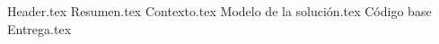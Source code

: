 \documentclass[letterpaper]{article}
\begin{document}
  {Header.tex}
  \vspace{1ex}
  {Resumen.tex}
  {Contexto.tex}
  {Modelo de la solución.tex}
  {Código base}
  {Entrega.tex}
\end{document}
